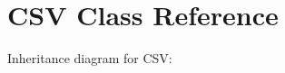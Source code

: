\hypertarget{classCSV}{}\section{C\+SV Class Reference}
\label{classCSV}


Inheritance diagram for C\+SV\+:

